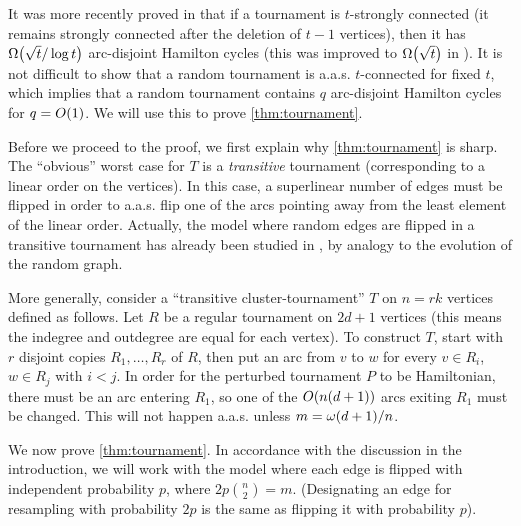 \documentclass[11pt,english]{article}
\theoremstyle{plain}
\theoremstyle{definition}
\theoremstyle{definition}
\theoremstyle{plain}
\theoremstyle{plain}
\theoremstyle{plain}
\theoremstyle{plain}
\theoremstyle{remark}
\theoremstyle{remark}
\let\originalleft\left
\let\originalright\right
\renewcommand{\left}{\mathopen{}\mathclose\bgroup\originalleft}
\renewcommand{\right}{\aftergroup\egroup\originalright}
\begin{document}
It was more recently proved in \cite{KLOP14} that if a tournament
is $t$-strongly connected (it remains strongly connected after the
deletion of $t-1$ vertices), then it has $\Omega\left(\sqrt{t}/\log t\right)$
arc-disjoint Hamilton cycles (this was improved to $\Omega\left(\sqrt{t}\right)$
in \cite{Pok14}). It is not difficult to show that a random tournament
is a.a.s. $t$-connected for fixed $t$, which implies that a random
tournament contains $q$ arc-disjoint Hamilton cycles for $q=O\left(1\right)$.
We will use this to prove \ref{thm:tournament}.

Before we proceed to the proof, we first explain why \ref{thm:tournament}
is sharp. The ``obvious'' worst case for $T$ is a \emph{transitive}
tournament (corresponding to a linear order on the vertices). In this
case, a superlinear number of edges must be flipped in order to a.a.s.
flip one of the arcs pointing away from the least element of the linear
order. Actually, the model where random edges are flipped in a transitive
tournament has already been studied in \cite{LRG96}, by analogy to
the evolution of the random graph.

More generally, consider a ``transitive cluster-tournament'' $T$
on $n=rk$ vertices defined as follows. Let $R$ be a regular tournament
on $2d+1$ vertices (this means the indegree and outdegree are equal
for each vertex). To construct $T$, start with $r$ disjoint copies
$R_{1},\dots,R_{r}$ of $R$, then put an arc from $v$ to $w$ for
every $v\in R_{i}$, $w\in R_{j}$ with $i<j$. In order for the perturbed
tournament $P$ to be Hamiltonian, there must be an arc entering $R_{1}$,
so one of the $O\left(n\left(d+1\right)\right)$ arcs exiting $R_{1}$
must be changed. This will not happen a.a.s. unless $m=\omega\left(d+1\right)/n$.

We now prove \ref{thm:tournament}. In accordance with the discussion
in the introduction, we will work with the model where each edge is
flipped with independent probability $p$, where $2p{n \choose 2}=m$.
(Designating an edge for resampling with probability $2p$ is the
same as flipping it with probability $p$).
\end{document}

